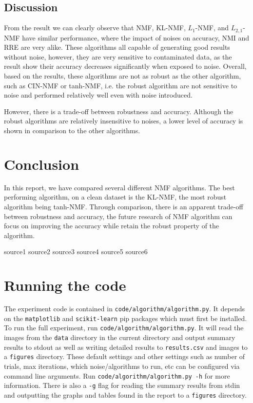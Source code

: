 \documentclass{article} %
\begin{document}
\subsection{Discussion}
From the result we can clearly observe that NMF, KL-NMF, $L_1$-NMF, and $L_{2,1}$-NMF have similar performance, where the impact of noises on accuracy, NMI and RRE are very alike. These algorithms all capable of generating good results without noise, however, they are very sensitive to contaminated data, as the result show their accuracy decreases significantly when exposed to noise. Overall, based on the results, these algorithms are not as robust as the other algorithm, such as CIN-NMF or tanh-NMF, i.e. the robust algorithm are not sensitive to noise and performed relatively well even with noise introduced.

However, there is a trade-off between robustness and accuracy. Although the robust algorithms are relatively insensitive to noises, a lower level of accuracy is shown in comparison to the other algorithms.

\section{Conclusion}
In this report, we have compared several different NMF algorithms. The best performing algorithm, on a clean dataset is the KL-NMF, the most robust algorithm being tanh-NMF. Through comparison, there is an apparent trade-off between robustness and accuracy, the future research of NMF algorithm can focus on improving the accuracy while retain the robust property of the algorithm.


\begin{thebibliography}{9}
 source1
 source2
 source3
 source4
 source5
 source6
\end{thebibliography}

\appendix

\section{Running the code}
The experiment code is contained in \texttt{code/algorithm/algorithm.py}. It depends on the \texttt{matplotlib} and \texttt{scikit-learn} pip packages which must first be installed. To run the full experiment, run \texttt{code/algorithm/algorithm.py}. It will read the images from the \texttt{data} directory in the current directory and output summary results to stdout as well as writing detailed results to \texttt{results.csv} and images to a \texttt{figures} directory. These default settings and other settings such as number of trials, max iterations, which noise/algorithms to run, etc can be configured via command line arguments. Run \texttt{code/algorithm/algorithm.py -h} for more information. There is also a \texttt{-g} flag for reading the summary results from stdin and outputting the graphs and tables found in the report to a \texttt{figures} directory.
\end{document}
